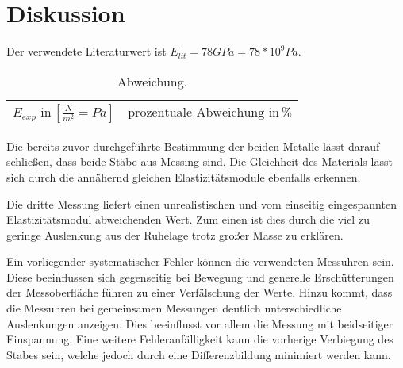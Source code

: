 \newpage
\section{Diskussion}
\label{sec:Diskussion}
Der verwendete Literaturwert ist $E_{lit} = 78 GPa = 78*10^9 Pa$\cite{litval}.
\begin{table}[h]
  \centering
  \label{tab:lit5}
  \begin{tabular}{ c c  }
    \toprule
    $E_{exp} \,\, \text{in} \, [\frac{N}{m^2}= Pa]$
   &{$\text{prozentuale Abweichung}\,\, \text{in} \, \% $} \\

    \midrule


    \bottomrule
  \end{tabular}
  \caption{Abweichung.}
\end{table}


Die bereits zuvor durchgeführte Bestimmung der beiden Metalle lässt darauf
schließen, dass beide Stäbe aus Messing sind. Die Gleichheit des Materials
lässt sich durch die annähernd gleichen Elastizitätsmodule ebenfalls
erkennen.

Die dritte Messung liefert einen unrealistischen und vom einseitig
eingespannten Elastizitätsmodul abweichenden Wert. Zum einen ist dies durch die viel zu geringe Auslenkung
aus der Ruhelage trotz großer Masse zu erklären.

Ein vorliegender systematischer Fehler können die verwendeten Messuhren sein.
Diese beeinflussen sich gegenseitig bei Bewegung und generelle Erschütterungen
der Messoberfläche führen zu einer Verfälschung der Werte. Hinzu kommt, dass
die Messuhren bei gemeinsamen Messungen deutlich unterschiedliche Auslenkungen
anzeigen. Dies beeinflusst vor allem die Messung mit beidseitiger
Einspannung.
Eine weitere Fehleranfälligkeit kann die vorherige Verbiegung des Stabes
sein, welche jedoch durch eine Differenzbildung minimiert werden kann.
